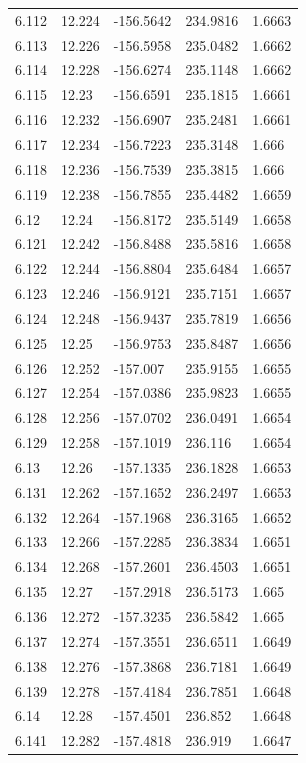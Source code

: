 \begin{tabular}{lllll}
6.112 & 12.224 & -156.5642 & 234.9816 & 1.6663 \\
6.113 & 12.226 & -156.5958 & 235.0482 & 1.6662 \\
6.114 & 12.228 & -156.6274 & 235.1148 & 1.6662 \\
6.115 & 12.23 & -156.6591 & 235.1815 & 1.6661 \\
6.116 & 12.232 & -156.6907 & 235.2481 & 1.6661 \\
6.117 & 12.234 & -156.7223 & 235.3148 & 1.666 \\
6.118 & 12.236 & -156.7539 & 235.3815 & 1.666 \\
6.119 & 12.238 & -156.7855 & 235.4482 & 1.6659 \\
6.12 & 12.24 & -156.8172 & 235.5149 & 1.6658 \\
6.121 & 12.242 & -156.8488 & 235.5816 & 1.6658 \\
6.122 & 12.244 & -156.8804 & 235.6484 & 1.6657 \\
6.123 & 12.246 & -156.9121 & 235.7151 & 1.6657 \\
6.124 & 12.248 & -156.9437 & 235.7819 & 1.6656 \\
6.125 & 12.25 & -156.9753 & 235.8487 & 1.6656 \\
6.126 & 12.252 & -157.007 & 235.9155 & 1.6655 \\
6.127 & 12.254 & -157.0386 & 235.9823 & 1.6655 \\
6.128 & 12.256 & -157.0702 & 236.0491 & 1.6654 \\
6.129 & 12.258 & -157.1019 & 236.116 & 1.6654 \\
6.13 & 12.26 & -157.1335 & 236.1828 & 1.6653 \\
6.131 & 12.262 & -157.1652 & 236.2497 & 1.6653 \\
6.132 & 12.264 & -157.1968 & 236.3165 & 1.6652 \\
6.133 & 12.266 & -157.2285 & 236.3834 & 1.6651 \\
6.134 & 12.268 & -157.2601 & 236.4503 & 1.6651 \\
6.135 & 12.27 & -157.2918 & 236.5173 & 1.665 \\
6.136 & 12.272 & -157.3235 & 236.5842 & 1.665 \\
6.137 & 12.274 & -157.3551 & 236.6511 & 1.6649 \\
6.138 & 12.276 & -157.3868 & 236.7181 & 1.6649 \\
6.139 & 12.278 & -157.4184 & 236.7851 & 1.6648 \\
6.14 & 12.28 & -157.4501 & 236.852 & 1.6648 \\
6.141 & 12.282 & -157.4818 & 236.919 & 1.6647 \\

\end{tabular}
